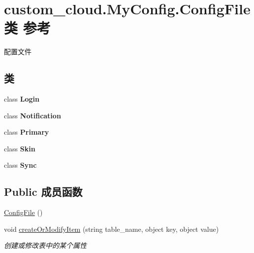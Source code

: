 \hypertarget{classcustom__cloud_1_1_my_config_1_1_config_file}{}\section{custom\+\_\+cloud.\+My\+Config.\+Config\+File类 参考}
\label{classcustom__cloud_1_1_my_config_1_1_config_file}


配置文件  


\subsection*{类}
\begin{DoxyCompactItemize}
\item 
class {\bfseries Login}
\item 
class {\bfseries Notification}
\item 
class {\bfseries Primary}
\item 
class {\bfseries Skin}
\item 
class {\bfseries Sync}
\end{DoxyCompactItemize}
\subsection*{Public 成员函数}
\begin{DoxyCompactItemize}
\item 
\hyperlink{classcustom__cloud_1_1_my_config_1_1_config_file_a2f5c03bbd49a4a54446106c776c90a48}{Config\+File} ()
\item 
void \hyperlink{classcustom__cloud_1_1_my_config_1_1_config_file_a1787259edceeeb0267a42cd6a011e011}{create\+Or\+Modify\+Item} (string table\+\_\+name, object key, object value)
\begin{DoxyCompactList}\small\item\em 创建或修改表中的某个属性 \end{DoxyCompactList}\end{DoxyCompactItemize}
